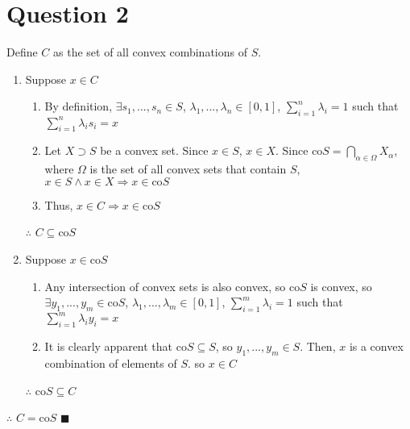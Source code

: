 \documentclass{article}
\newcommand{\coS}{\text{co}S}
\newcommand{\intersect}{\bigcap}
\begin{document}
\section*{Question 2}
Define $C$ as the set of all convex combinations of $S$.
\begin{enumerate}
	\item Suppose $x\in C$
		\begin{enumerate}
			\item By definition, $\exists s_1,...,s_n\in S$, $\lambda_1,...,\lambda_n\in[0,1]$, $\sum_{i=1}^n\lambda_i=1$ such that ${\sum_{i=1}^n\lambda_i s_i=x}$
			\item Let $X\supset S$ be a convex set. Since $x\in S$, $x\in X$. Since $\coS=\intersect_{\alpha\in\Omega}X_\alpha$, where $\Omega$ is the set of all convex sets that contain $S$, ${x\in S\land x\in X\Rightarrow x\in\coS}$
			\item Thus, $x\in C\Rightarrow x\in\coS$
		\end{enumerate}
		$\therefore$ $C\subseteq\coS$
	
	\item Suppose $x\in\coS$
		\begin{enumerate}
			\item Any intersection of convex sets is also convex, so $\coS$ is convex, so $\exists y_1,...,y_m\in\coS$, $\lambda_1,...,\lambda_m\in[0,1]$, $\sum_{i=1}^m\lambda_i=1$ such that ${\sum_{i=1}^m\lambda_i y_i = x}$
			\item It is clearly apparent that $\coS\subseteq S$, so $y_1,...,y_m\in S$. Then, $x$ is a convex combination of elements of $S$. so $x\in C$
		\end{enumerate}
		$\therefore$ $\coS\subseteq C$
		
\end{enumerate}
$\therefore$ $C=\coS$ $\blacksquare$


\end{document}
